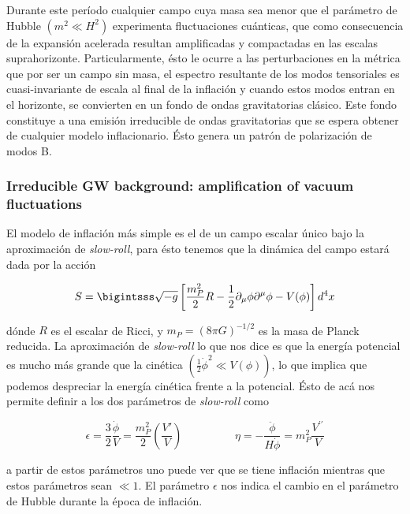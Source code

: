 Durante este período cualquier campo cuya masa sea menor que el parámetro de Hubble $(m^2 \ll H^2)$ experimenta fluctuaciones cuánticas, que como consecuencia de la expansión acelerada resultan amplificadas y compactadas en las escalas suprahorizonte. Particularmente, ésto le ocurre a las perturbaciones en la métrica que por ser un campo sin masa, el espectro resultante de los modos tensoriales es cuasi-invariante de escala al final de la inflación y cuando estos modos entran en el horizonte, se convierten en un fondo de ondas gravitatorias clásico. Este fondo constituye a una emisión irreducible de ondas gravitatorias que se espera obtener de cualquier modelo inflacionario. Ésto genera un patrón de polarización de modos B.

\subsubsection{Irreducible GW background: amplification of vacuum fluctuations}

El modelo de inflación más simple es el de un campo escalar único bajo la aproximación de \textit{slow-roll}, para ésto tenemos que la dinámica del campo estará dada por la acción

\begin{equation}
    S = \bigintsss \sqrt{-g} \left[ \frac{m^2_{P}}{2} R - \frac{1}{2} \partial_\mu \phi \partial^\mu \phi - V (\phi) \right] d^4 x
\end{equation}

\noindent
dónde $R$ es el escalar de Ricci, y $m_P =(8 \pi G)^{-1/2}$ es la masa de Planck reducida. La aproximación de \textit{slow-roll} lo que nos dice es que la energía potencial es mucho más grande que la cinética $\displaystyle \left( \frac{1}{2} \dot{\phi}^2 \ll V (\phi) \right)$, lo que implica que podemos despreciar la energía cinética frente a la potencial. Ésto de acá nos permite definir a los dos parámetros de \textit{slow-roll} como

\begin{equation}
    \epsilon = \frac{3}{2} \frac{\dot{\phi}}{V} = \frac{m_P^2}{2} \left( \frac{V'}{V} \right) \hspace{2cm} \eta = -\frac{\ddot{\phi}}{H\dot{\phi}} = m_P^2 \frac{V^{\prime \prime}}{V}
\end{equation}

\noindent
a partir de estos parámetros uno puede ver que se tiene inflación mientras que estos parámetros sean $\ll 1$. El parámetro $\epsilon$ nos indica el cambio en el parámetro de Hubble durante la época de inflación.

